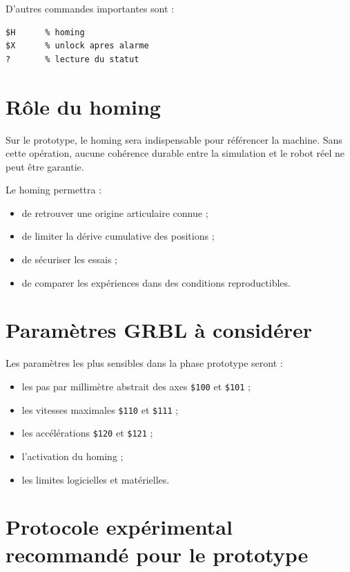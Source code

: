 \documentclass[12pt,a4paper]{report}
\begin{document}
D'autres commandes importantes sont :

\begin{lstlisting}[style=codestyle,caption={Commandes utiles pour la phase prototype}]
$H      % homing
$X      % unlock apres alarme
?       % lecture du statut
\end{lstlisting}

\section{Rôle du homing}

Sur le prototype, le homing sera indispensable pour référencer la machine. Sans cette
opération, aucune cohérence durable entre la simulation et le robot réel ne peut être
garantie.

Le homing permettra :

\begin{itemize}
    \item de retrouver une origine articulaire connue ;
    \item de limiter la dérive cumulative des positions ;
    \item de sécuriser les essais ;
    \item de comparer les expériences dans des conditions reproductibles.
\end{itemize}

\section{Paramètres GRBL à considérer}

Les paramètres les plus sensibles dans la phase prototype seront :

\begin{itemize}
    \item les pas par millimètre abstrait des axes \texttt{\$100} et \texttt{\$101} ;
    \item les vitesses maximales \texttt{\$110} et \texttt{\$111} ;
    \item les accélérations \texttt{\$120} et \texttt{\$121} ;
    \item l'activation du homing ;
    \item les limites logicielles et matérielles.
\end{itemize}

\section{Protocole expérimental recommandé pour le prototype}
\end{document}
